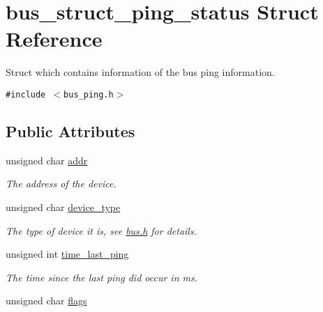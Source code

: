 \hypertarget{structbus__struct__ping__status}{
\section{bus\_\-struct\_\-ping\_\-status Struct Reference}
\label{structbus__struct__ping__status}
}
Struct which contains information of the bus ping information.  


{\tt \#include $<$bus\_\-ping.h$>$}

\subsection*{Public Attributes}
\begin{CompactItemize}
\item 
\hypertarget{structbus__struct__ping__status_cd059e45d0f0af76f94230d2e0cf30ee}{
unsigned char \hyperlink{structbus__struct__ping__status_cd059e45d0f0af76f94230d2e0cf30ee}{addr}}
\label{structbus__struct__ping__status_cd059e45d0f0af76f94230d2e0cf30ee}

\begin{CompactList}\small\item\em The address of the device. \item\end{CompactList}\item 
\hypertarget{structbus__struct__ping__status_087fd50f1ebbcb5fa3cf0d55132f65b4}{
unsigned char \hyperlink{structbus__struct__ping__status_087fd50f1ebbcb5fa3cf0d55132f65b4}{device\_\-type}}
\label{structbus__struct__ping__status_087fd50f1ebbcb5fa3cf0d55132f65b4}

\begin{CompactList}\small\item\em The type of device it is, see \hyperlink{bus_8h}{bus.h} for details. \item\end{CompactList}\item 
\hypertarget{structbus__struct__ping__status_50c843fb2106e5edd9fb25f466b6a6f0}{
unsigned int \hyperlink{structbus__struct__ping__status_50c843fb2106e5edd9fb25f466b6a6f0}{time\_\-last\_\-ping}}
\label{structbus__struct__ping__status_50c843fb2106e5edd9fb25f466b6a6f0}

\begin{CompactList}\small\item\em The time since the last ping did occur in ms. \item\end{CompactList}\item 
\hypertarget{structbus__struct__ping__status_b5bb85a17c8b1259bb675719bdf4e8c1}{
unsigned char \hyperlink{structbus__struct__ping__status_b5bb85a17c8b1259bb675719bdf4e8c1}{flags}}
\label{structbus__struct__ping__status_b5bb85a17c8b1259bb675719bdf4e8c1}


\end{CompactItemize}
